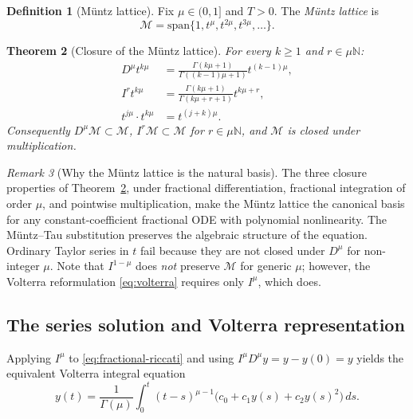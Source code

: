 \documentclass[11pt]{article}
\newtheorem{theorem}{Theorem}[section]
\theoremstyle{definition}
\newtheorem{definition}[theorem]{Definition}
\theoremstyle{remark}
\newtheorem{remark}[theorem]{Remark}
\begin{document}
\begin{definition}[M\"untz lattice]
\label{def:muntz}
Fix $\mu\in(0,1]$ and $T>0$. The \emph{M\"untz lattice} is
\begin{equation}
\mathcal{M}=\mathrm{span}\{1,t^{\mu},t^{2\mu},t^{3\mu},\ldots\}.
\label{eq:muntz-lattice}
\end{equation}
\end{definition}

\begin{theorem}[Closure of the M\"untz lattice]
\label{thm:closure}
For every $k\ge 1$ and $r\in\mu\mathbb{N}$:
\begin{align}
D^{\mu}t^{k\mu}&=\frac{\Gamma(k\mu+1)}{\Gamma((k-1)\mu+1)}t^{(k-1)\mu},
\label{eq:Dmu-muntz}\\
I^{r}t^{k\mu}&=\frac{\Gamma(k\mu+1)}{\Gamma(k\mu+r+1)}t^{k\mu+r},
\label{eq:Ir-muntz}\\
t^{j\mu}\cdot t^{k\mu}&=t^{(j+k)\mu}.
\label{eq:product-muntz}
\end{align}
Consequently $D^{\mu}\mathcal{M}\subset\mathcal{M}$, $I^{r}\mathcal{M}\subset\mathcal{M}$ for $r\in\mu\mathbb{N}$, and $\mathcal{M}$ is closed under multiplication.
\end{theorem}

\begin{remark}[Why the M\"untz lattice is the natural basis]
\label{rem:muntz-natural}
The three closure properties of Theorem~\ref{thm:closure}, under fractional differentiation, fractional integration of order $\mu$, and pointwise multiplication, make the M\"untz lattice the canonical basis for any constant-coefficient fractional ODE with polynomial nonlinearity. The M\"untz--Tau substitution preserves the algebraic structure of the equation. Ordinary Taylor series in $t$ fail because they are not closed under $D^{\mu}$ for non-integer $\mu$. Note that $I^{1-\mu}$ does \emph{not} preserve $\mathcal{M}$ for generic $\mu$; however, the Volterra reformulation \eqref{eq:volterra} requires only $I^{\mu}$, which does.
\end{remark}

\subsection{The series solution and Volterra representation}
\label{sec:heston-series}

Applying $I^{\mu}$ to \eqref{eq:fractional-riccati} and using $I^{\mu}D^{\mu}y=y-y(0)=y$ yields the equivalent Volterra integral equation
\begin{equation}
y(t)=\frac{1}{\Gamma(\mu)}\int_{0}^{t}(t-s)^{\mu-1}\bigl(c_{0}+c_{1}y(s)+c_{2}y(s)^{2}\bigr)\,ds.
\label{eq:volterra}
\end{equation}
\end{document}
